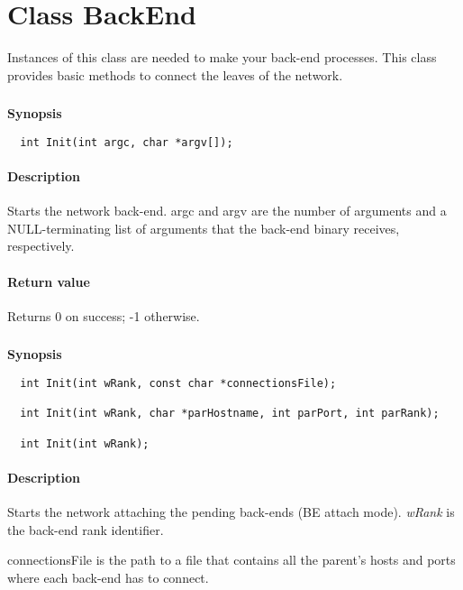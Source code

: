 \documentclass[twoside,a4,english,11pt]{book}
\begin{document}
\section{Class BackEnd}

Instances of this class are needed to make your back-end processes. This class provides basic methods to connect the leaves of the network.

\subsubsection{}

\textbf{Synopsis}
\begin{lstlisting}
  int Init(int argc, char *argv[]);
\end{lstlisting}

\paragraph{Description}
  Starts the network back-end. argc and argv are the number of arguments and a NULL-terminating 
  list of arguments that the back-end binary receives, respectively.

\paragraph{Return value}
  Returns 0 on success; -1 otherwise.
      
\subsubsection{}

\textbf{Synopsis}
\begin{lstlisting}
  int Init(int wRank, const char *connectionsFile);

  int Init(int wRank, char *parHostname, int parPort, int parRank);

  int Init(int wRank);
\end{lstlisting}

\paragraph{Description}
  Starts the network attaching the pending back-ends (BE attach mode). 
  \emph{wRank} is the back-end rank identifier.
  
  connectionsFile is the path to a file that contains all the parent's hosts
  and ports where each back-end has to connect.
  
\end{document}
